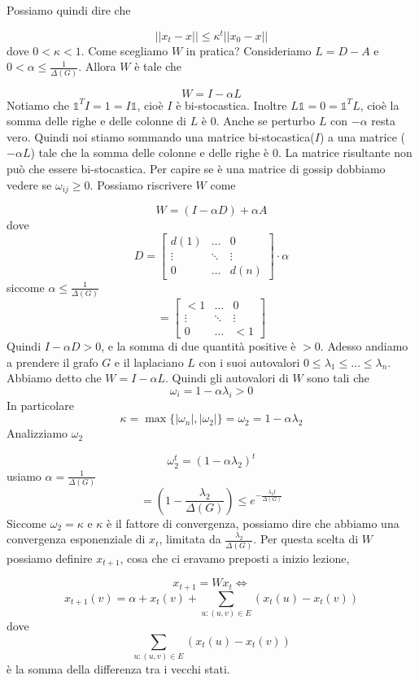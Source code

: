 \documentclass[12pt]{report}
\begin{document}
\noindent
Possiamo quindi dire che

$$||x_t - x || \leq \kappa^t ||x_0 - x||$$ 
dove $0 < \kappa < 1$.
Come scegliamo $W$ in pratica? Consideriamo $L = D-A$ e $0 < \alpha \leq \frac{1}{\Delta(G)}$. Allora $W$ è tale che 

$$W = I - \alpha L$$
Notiamo che $\mathds{1}^T I = 1 = I \mathds{1}$, cioè $I$ è bi-stocastica. Inoltre $L \mathds{1} = 0 = \mathds{1}^T L$, cioè la somma delle righe e delle colonne di $L$ è $0$. Anche se perturbo $L$ con $-\alpha$ resta vero. Quindi noi stiamo sommando una matrice bi-stocastica($I$) a una matrice ($-\alpha L$)  tale che la somma delle colonne e delle righe è $0$. La matrice risultante non può che essere bi-stocastica. Per capire se è una matrice di gossip dobbiamo vedere se $\omega_{ij}\geq 0$. Possiamo riscrivere $W$ come

$$W = (I- \alpha D) + \alpha A$$
dove 
\[
    D = \begin{bmatrix}
        d(1) & \dots & 0 \\
        \vdots & \ddots & \vdots \\
        0 & \dots & d(n)
    \end{bmatrix}
    \cdot \alpha
\]
siccome $\alpha \leq \frac{1}{\Delta(G)}$
\[
    = \begin{bmatrix}
        < 1 & \dots & 0 \\
        \vdots & \ddots & \vdots \\
        0 & \dots & < 1
    \end{bmatrix}
\]
Quindi $I - \alpha D > 0$, e la somma di due quantità positive è $> 0$. 
Adesso andiamo a prendere il grafo $G$ e il laplaciano $L$ con i suoi autovalori $0 \leq \lambda_1 \leq \dots \leq \lambda_n$. Abbiamo detto che $W = I - \alpha L$. Quindi gli autovalori di $W$ sono tali che 
$$\omega_i = 1 - \alpha \lambda_i > 0$$
In particolare
$$\kappa = \max\{|\omega_n|,|\omega_2|\} = \omega_2 = 1 -\alpha \lambda_2$$
Analizziamo $\omega_2$

$$\omega_2^t = (1- \alpha \lambda_2)^t$$
usiamo $\alpha = \frac{1}{\Delta(G)}$
$$= (1- \frac{\lambda_2}{\Delta(G)}) \leq e^{- \frac{\lambda_2 t}{\Delta(G)}}$$
Siccome $\omega_2 = \kappa$ e $\kappa$ è il fattore di convergenza, possiamo dire che abbiamo una convergenza esponenziale di $x_t$, limitata da $\frac{\lambda_2}{\Delta(G)}$. Per questa scelta di $W$ possiamo definire $x_{t+1}$, cosa che ci eravamo preposti a inizio lezione,

$$x_{t+1} = W x_t \Leftrightarrow $$
$$x_{t+1}(v) = \alpha + x_t(v) + \sum_{u : (u,v) \in E} (x_t(u) - x_t(v))$$
dove 
$$\sum_{u : (u,v) \in E} (x_t(u) - x_t(v))$$
è la somma della differenza tra i vecchi stati.
\end{document}
